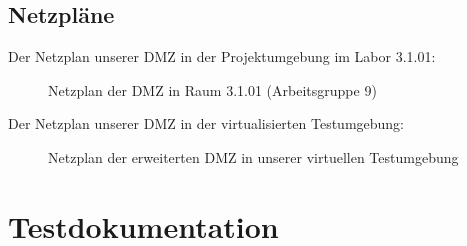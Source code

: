 

\clearpage



\clearpage

\subsection{Netzpläne}
\label{app:Netzplan}
Der Netzplan unserer \ac{DMZ} in der Projektumgebung im Labor 3.1.01:
\begin{figure}[htb]
\centering
{}
\caption{Netzplan der \ac{DMZ} in Raum 3.1.01 (Arbeitsgruppe 9)}
\end{figure}

Der Netzplan unserer \ac{DMZ} in der virtualisierten Testumgebung:
\begin{figure}[htb]
    \centering
    \caption{Netzplan der erweiterten \ac{DMZ} in unserer virtuellen Testumgebung}
\end{figure}
\clearpage



\clearpage

\section{Testdokumentation}
\label{app:Test}



